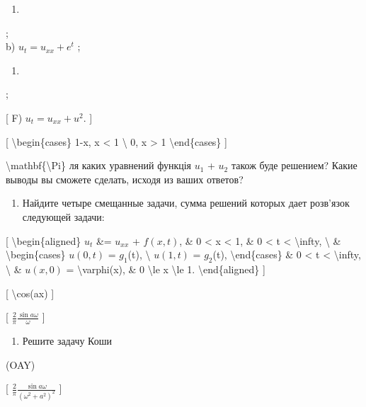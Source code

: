 \documentclass[
]{article}
\providecommand{\tightlist}{%
  \setlength{\itemsep}{0pt}\setlength{\parskip}{0pt}}
\begin{document}
{{\begin{enumerate}
\def\labelenumi{\alph{enumi})}
\tightlist
\item
\end{enumerate}

;\\
b) \(u_t = u_{xx} + e^t\) ;

\begin{enumerate}
\def\labelenumi{\Alph{enumi})}
\setcounter{enumi}{1}
\tightlist
\item
\end{enumerate}

;

{[} F) \(u_t = u_{xx} + u^2\). {]}

{[} \textbackslash begin\{cases\} 1-\textbar x\textbar,
\textbar x\textbar{} \textless{} 1 \textbackslash{} 0,
\textbar x\textbar{} \textgreater{} 1 \textbackslash end\{cases\} {]}

\textbackslash mathbf\{\textbackslash Pi\} ля каких уравнений функція
\(u_1\) + \(u_2\) також буде решением? Какие выводы вы сможете сделать,
исходя из ваших ответов?

\begin{enumerate}
\def\labelenumi{\arabic{enumi}.}
\setcounter{enumi}{3}
\tightlist
\item
  Найдите четыре смещанные задачи, сумма решений которых дает розв'язок
  следующей задачи:
\end{enumerate}

{[} \textbackslash begin\{aligned\} \(u_t\) \&= \(u_{xx}\) +
\(f(x, t)\), \& 0 \textless{} x \textless{} 1, \& 0 \textless{} t
\textless{} \textbackslash infty, \textbackslash{} \&
\textbackslash begin\{cases\} \(u(0, t)\) = \(g_1\)(t), \textbackslash{}
\(u(1, t)\) = \(g_2\)(t), \textbackslash end\{cases\} \& 0 \textless{} t
\textless{} \textbackslash infty, \textbackslash{} \& \(u(x, 0)\) =
\textbackslash varphi(x), \& 0 \textbackslash le x \textbackslash le 1.
\textbackslash end\{aligned\} {]}

{[} \textbackslash cos(ax) {]}

{[} \(\frac{2}{\pi} \frac{\sin a\omega}{\omega}\) {]}

\begin{enumerate}
\def\labelenumi{\arabic{enumi}.}
\setcounter{enumi}{4}
\tightlist
\item
  Решите задачу Коши
\end{enumerate}

(OAY)

{[} \(\frac{2}{\pi} \frac{\sin a\omega}{(\omega^2+a^2)^2}\) {]}

}}
\end{document}
